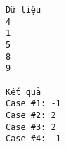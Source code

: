 \begin{verbatim}
Dữ liệu
4
1
5
8
9

Kết quả
Case #1: -1
Case #2: 2
Case #3: 2
Case #4: -1
\end{verbatim}